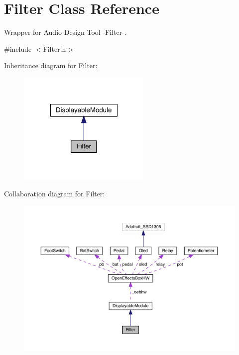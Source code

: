 \hypertarget{class_filter}{}\section{Filter Class Reference}
\label{class_filter}


Wrapper for Audio Design Tool -\/\+Filter-\/.  




{\ttfamily \#include $<$Filter.\+h$>$}



Inheritance diagram for Filter\+:
\nopagebreak
\begin{figure}[H]
\begin{center}
\leavevmode
\includegraphics[width=180pt]{class_filter__inherit__graph}
\end{center}
\end{figure}


Collaboration diagram for Filter\+:
\nopagebreak
\begin{figure}[H]
\begin{center}
\leavevmode
\includegraphics[width=350pt]{class_filter__coll__graph}
\end{center}
\end{figure}
